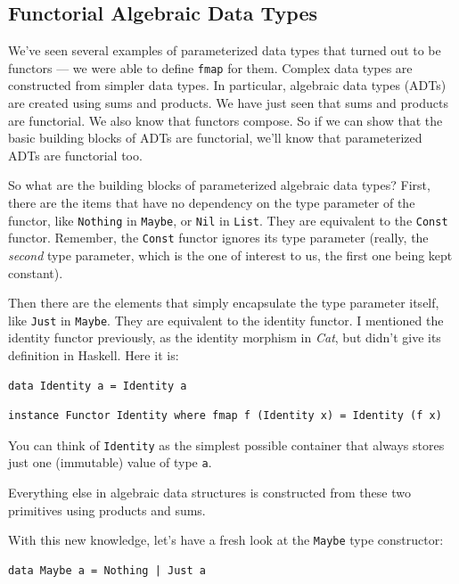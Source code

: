\subsection{Functorial Algebraic Data
Types}\label{functorial-algebraic-data-types}

We've seen several examples of parameterized data types that turned out
to be functors --- we were able to define \texttt{fmap} for them.
Complex data types are constructed from simpler data types. In
particular, algebraic data types (ADTs) are created using sums and
products. We have just seen that sums and products are functorial. We
also know that functors compose. So if we can show that the basic
building blocks of ADTs are functorial, we'll know that parameterized
ADTs are functorial too.

So what are the building blocks of parameterized algebraic data types?
First, there are the items that have no dependency on the type parameter
of the functor, like \texttt{Nothing} in \texttt{Maybe}, or \texttt{Nil}
in \texttt{List}. They are equivalent to the \texttt{Const} functor.
Remember, the \texttt{Const} functor ignores its type parameter (really,
the \emph{second} type parameter, which is the one of interest to us,
the first one being kept constant).

Then there are the elements that simply encapsulate the type parameter
itself, like \texttt{Just} in \texttt{Maybe}. They are equivalent to the
identity functor. I mentioned the identity functor previously, as the
identity morphism in \emph{Cat}, but didn't give its definition in
Haskell. Here it is:

\begin{verbatim}
data Identity a = Identity a
\end{verbatim}

\begin{verbatim}
instance Functor Identity where fmap f (Identity x) = Identity (f x)
\end{verbatim}

You can think of \texttt{Identity} as the simplest possible container
that always stores just one (immutable) value of type \texttt{a}.

Everything else in algebraic data structures is constructed from these
two primitives using products and sums.

With this new knowledge, let's have a fresh look at the \texttt{Maybe}
type constructor:

\begin{verbatim}
data Maybe a = Nothing | Just a
\end{verbatim}

